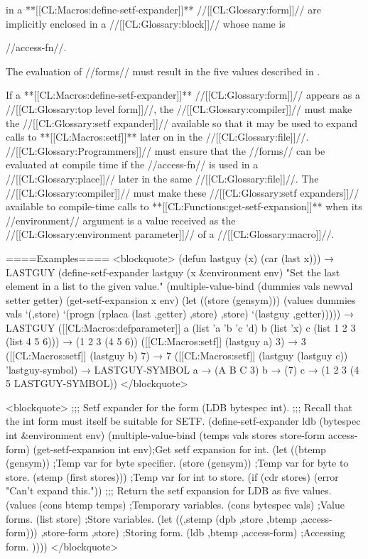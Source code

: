 in a **[[CL:Macros:define-setf-expander]]** //[[CL:Glossary:form]]// are implicitly enclosed in a //[[CL:Glossary:block]]// whose name is

//access-fn//.

The evaluation of //forms// must result in the five values described in \secref\SetfExpansions.

If a **[[CL:Macros:define-setf-expander]]** //[[CL:Glossary:form]]// appears as a //[[CL:Glossary:top level form]]//, the //[[CL:Glossary:compiler]]// must make the //[[CL:Glossary:setf expander]]// available so that it may be used to expand calls to **[[CL:Macros:setf]]** later on in the //[[CL:Glossary:file]]//. //[[CL:Glossary:Programmers]]// must ensure that the //forms// can be evaluated at compile time if the //access-fn// is used in a //[[CL:Glossary:place]]// later in the same //[[CL:Glossary:file]]//. The //[[CL:Glossary:compiler]]// must make these //[[CL:Glossary:setf expanders]]// available to compile-time calls to **[[CL:Functions:get-setf-expansion]]** when its //environment// argument is a value received as the //[[CL:Glossary:environment parameter]]// of a //[[CL:Glossary:macro]]//.

====Examples==== <blockquote> (defun lastguy (x) (car (last x))) → LASTGUY (define-setf-expander lastguy (x &environment env) "Set the last element in a list to the given value." (multiple-value-bind (dummies vals newval setter getter) (get-setf-expansion x env) (let ((store (gensym))) (values dummies vals `(,store) `(progn (rplaca (last ,getter) ,store) ,store) `(lastguy ,getter))))) → LASTGUY ([[CL:Macros:defparameter]] a (list 'a 'b 'c 'd) b (list 'x) c (list 1 2 3 (list 4 5 6))) → (1 2 3 (4 5 6)) ([[CL:Macros:setf]] (lastguy a) 3) → 3 ([[CL:Macros:setf]] (lastguy b) 7) → 7 ([[CL:Macros:setf]] (lastguy (lastguy c)) 'lastguy-symbol) → LASTGUY-SYMBOL a → (A B C 3) b → (7) c → (1 2 3 (4 5 LASTGUY-SYMBOL)) </blockquote>



<blockquote> ;;; Setf expander for the form (LDB bytespec int). ;;; Recall that the int form must itself be suitable for SETF. (define-setf-expander ldb (bytespec int &environment env) (multiple-value-bind (temps vals stores store-form access-form) (get-setf-expansion int env);Get setf expansion for int. (let ((btemp (gensym)) ;Temp var for byte specifier. (store (gensym)) ;Temp var for byte to store. (stemp (first stores))) ;Temp var for int to store. (if (cdr stores) (error "Can't expand this.")) ;;; Return the setf expansion for LDB as five values. (values (cons btemp temps) ;Temporary variables. (cons bytespec vals) ;Value forms. (list store) ;Store variables. \bq(let ((,stemp (dpb ,store ,btemp ,access-form))) ,store-form ,store) ;Storing form. \bq(ldb ,btemp ,access-form) ;Accessing form. )))) </blockquote>

